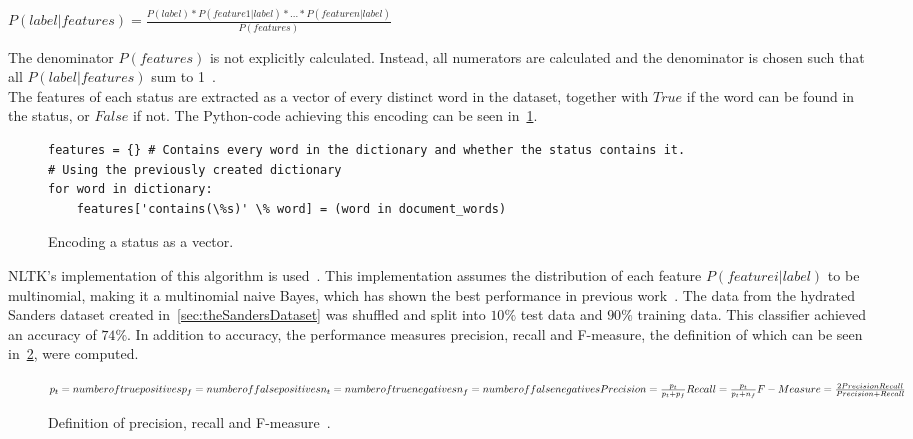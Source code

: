 \begin{math}
    P(label|features) = \frac{P(label)*P(feature 1|label)*...*P(feature n|label)}{P(features)}
\end{math}


The denominator $P(features)$ is not explicitly calculated.
Instead, all numerators are calculated and the denominator is chosen such that all $P(label|features)$ sum to 1~\cite{nltkDocs}.
\\
The features of each status are extracted as a vector of every distinct word in the dataset,
together with $True$ if the word can be found in the status, or $False$ if not.
The Python-code achieving this encoding can be seen in~\ref{code:extract_features}.

\begin{figure}
    \caption{Encoding a status as a vector.}
    \label{code:extract_features}
    \begin{verbatim}
features = {} # Contains every word in the dictionary and whether the status contains it.
# Using the previously created dictionary
for word in dictionary:
    features['contains(\%s)' \% word] = (word in document_words)
    \end{verbatim}
\end{figure}

NLTK's implementation of this algorithm is used~\cite{nltkDocs}.
This implementation assumes the distribution of each feature $P(feature i|label)$ to be multinomial,
making it a multinomial naive Bayes, which has shown the best performance in previous work~\cite{Go2009}.
The data from the hydrated Sanders dataset created in~\ref{sec:theSandersDataset} was shuffled and split into $10\%$ test data and $90\%$ training data.
This classifier achieved an accuracy of $74\%$.
In addition to accuracy, the performance measures precision, recall and F-measure,
the definition of which can be seen in~\ref{math:precision_recall_fmeasure}, were computed.

\begin{figure}
    \caption{Definition of precision, recall and F-measure~\cite{Hong2010}.}
    \label{math:precision_recall_fmeasure}
    \begin{math}
        p_t = number of true positives
        p_f = number of false positives
        n_t = number of true negatives
        n_f = number of false negatives

        Precision = \frac{p_t}{p_t + p_f}
        Recall = \frac{p_t}{p_t + n_f}

        F-Measure = \frac{2 \* Precision \* Recall}{Precision + Recall}
    \end{math}
\end{figure}

